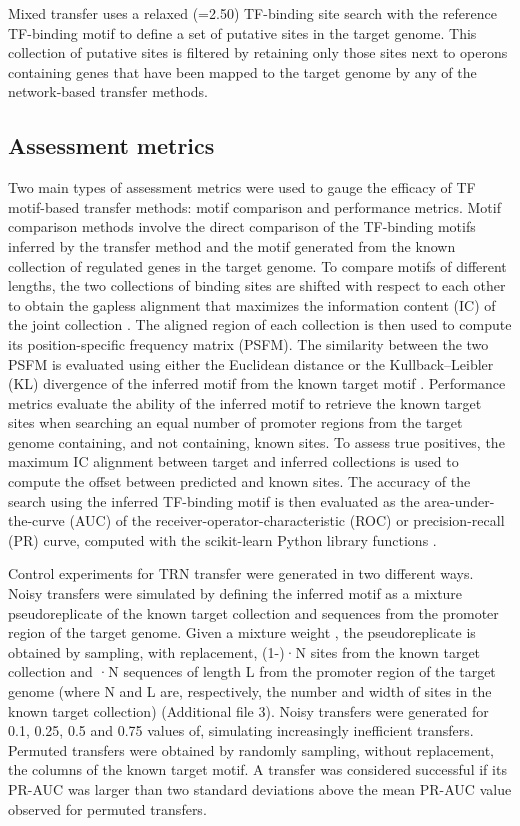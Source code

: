 Mixed transfer uses a relaxed (=2.50) TF-binding site search with the reference
TF-binding motif to define a set of putative sites in the target genome. This
collection of putative sites is filtered by retaining only those sites next to
operons containing genes that have been mapped to the target genome by any of
the network-based transfer methods.

\subsection{Assessment metrics}

Two main types of assessment metrics were used to gauge the efficacy of TF
motif-based transfer methods: motif comparison and performance metrics. Motif
comparison methods involve the direct comparison of the TF-binding motifs
inferred by the transfer method and the motif generated from the known
collection of regulated genes in the target genome. To compare motifs of
different lengths, the two collections of binding sites are shifted with
respect to each other to obtain the gapless alignment that maximizes the
information content (IC) of the joint collection
\cite{schneider1986information}. The aligned region of each collection is then
used to compute its position-specific frequency matrix (PSFM). The similarity
between the two PSFM is evaluated using either the Euclidean distance or the
Kullback–Leibler (KL) divergence of the inferred motif from the known target
motif \cite{gupta2007quantifying}. Performance metrics evaluate the ability of
the inferred motif to retrieve the known target sites when searching an equal
number of promoter regions from the target genome containing, and not
containing, known sites. To assess true positives, the maximum IC alignment
between target and inferred collections is used to compute the offset between
predicted and known sites. The accuracy of the search using the inferred
TF-binding motif is then evaluated as the area-under-the-curve (AUC) of the
receiver-operator-characteristic (ROC) or precision-recall (PR) curve, computed
with the scikit-learn Python library functions \cite{lewis1991evaluating,
  zweig1993receiver, scikit-learn}.

Control experiments for TRN transfer were generated in two different
ways. Noisy transfers were simulated by defining the inferred motif as a
mixture pseudoreplicate of the known target collection and sequences from the
promoter region of the target genome. Given a mixture weight , the
pseudoreplicate is obtained by sampling, with replacement, (1-)·N sites from
the known target collection and ·N sequences of length L from the promoter
region of the target genome (where N and L are, respectively, the number and
width of sites in the known target collection) (Additional file 3). Noisy
transfers were generated for 0.1, 0.25, 0.5 and 0.75 values of, simulating
increasingly inefficient transfers. Permuted transfers were obtained by
randomly sampling, without replacement, the columns of the known target
motif. A transfer was considered successful if its PR-AUC was larger than two
standard deviations above the mean PR-AUC value observed for permuted
transfers.
